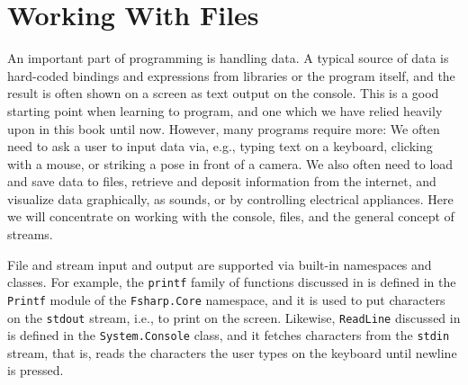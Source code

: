 \documentclass[fsharpNotes.tex]{subfiles}
\begin{document}
\chapter{Working With Files}
\label{chap:IO}


An important part of programming is handling data. A typical source of data is hard-coded bindings and expressions from libraries or the program itself, and the result is often shown on a screen as text output on the console. This is a good starting point when learning to program, and one which we have relied heavily upon in this book until now. However, many programs require more: We often need to ask a user to input data via, e.g., typing text on a keyboard, clicking with a mouse, or striking a pose in front of a camera. We also often need to load and save data to files, retrieve and deposit information from the internet, and visualize data graphically, as sounds, or by controlling electrical appliances. Here we will concentrate on working with the console, files, and the general concept of streams.

File and stream input and output are supported via built-in namespaces and classes. For example, the \lstinline!printf! family of functions discussed in  is defined in the \lstinline!Printf! module of the \lstinline!Fsharp.Core! namespace, and it is used to put characters on the \lstinline{stdout} stream, i.e., to print on the screen. Likewise, \lstinline{ReadLine} discussed in  is defined in the \lstinline{System.Console} class, and it fetches characters from the \lstinline{stdin} stream, that is, reads the characters the user types on the keyboard until newline is pressed.
\end{document}
